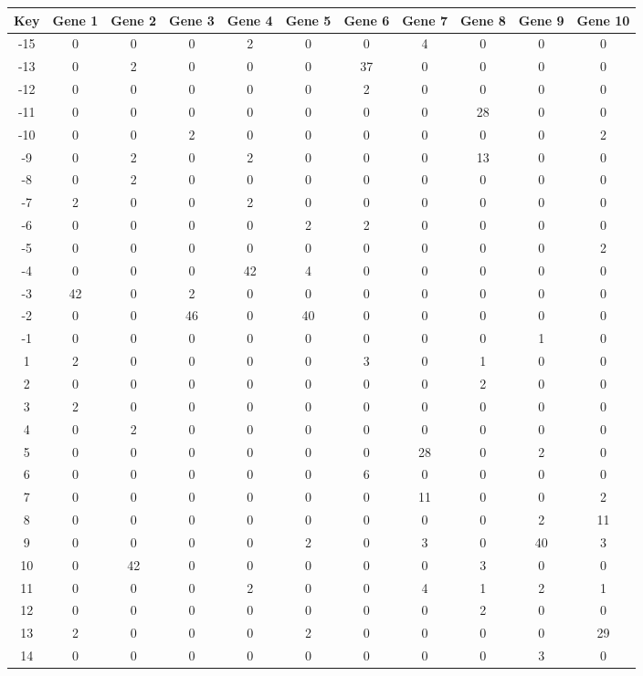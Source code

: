 \begin{tabular}{|c|c|c|c|c|c|c|c|c|c|c|}
\hline
Key & Gene 1 & Gene 2 & Gene 3 & Gene 4 & Gene 5 & Gene 6 & Gene 7 & Gene 8 & Gene 9 & Gene 10 \\
\hline
-15 & 0 & 0 & 0 & 2 & 0 & 0 & 4 & 0 & 0 & 0 \\
-13 & 0 & 2 & 0 & 0 & 0 & 37 & 0 & 0 & 0 & 0 \\
-12 & 0 & 0 & 0 & 0 & 0 & 2 & 0 & 0 & 0 & 0 \\
-11 & 0 & 0 & 0 & 0 & 0 & 0 & 0 & 28 & 0 & 0 \\
-10 & 0 & 0 & 2 & 0 & 0 & 0 & 0 & 0 & 0 & 2 \\
-9 & 0 & 2 & 0 & 2 & 0 & 0 & 0 & 13 & 0 & 0 \\
-8 & 0 & 2 & 0 & 0 & 0 & 0 & 0 & 0 & 0 & 0 \\
-7 & 2 & 0 & 0 & 2 & 0 & 0 & 0 & 0 & 0 & 0 \\
-6 & 0 & 0 & 0 & 0 & 2 & 2 & 0 & 0 & 0 & 0 \\
-5 & 0 & 0 & 0 & 0 & 0 & 0 & 0 & 0 & 0 & 2 \\
-4 & 0 & 0 & 0 & 42 & 4 & 0 & 0 & 0 & 0 & 0 \\
-3 & 42 & 0 & 2 & 0 & 0 & 0 & 0 & 0 & 0 & 0 \\
-2 & 0 & 0 & 46 & 0 & 40 & 0 & 0 & 0 & 0 & 0 \\
-1 & 0 & 0 & 0 & 0 & 0 & 0 & 0 & 0 & 1 & 0 \\
1 & 2 & 0 & 0 & 0 & 0 & 3 & 0 & 1 & 0 & 0 \\
2 & 0 & 0 & 0 & 0 & 0 & 0 & 0 & 2 & 0 & 0 \\
3 & 2 & 0 & 0 & 0 & 0 & 0 & 0 & 0 & 0 & 0 \\
4 & 0 & 2 & 0 & 0 & 0 & 0 & 0 & 0 & 0 & 0 \\
5 & 0 & 0 & 0 & 0 & 0 & 0 & 28 & 0 & 2 & 0 \\
6 & 0 & 0 & 0 & 0 & 0 & 6 & 0 & 0 & 0 & 0 \\
7 & 0 & 0 & 0 & 0 & 0 & 0 & 11 & 0 & 0 & 2 \\
8 & 0 & 0 & 0 & 0 & 0 & 0 & 0 & 0 & 2 & 11 \\
9 & 0 & 0 & 0 & 0 & 2 & 0 & 3 & 0 & 40 & 3 \\
10 & 0 & 42 & 0 & 0 & 0 & 0 & 0 & 3 & 0 & 0 \\
11 & 0 & 0 & 0 & 2 & 0 & 0 & 4 & 1 & 2 & 1 \\
12 & 0 & 0 & 0 & 0 & 0 & 0 & 0 & 2 & 0 & 0 \\
13 & 2 & 0 & 0 & 0 & 2 & 0 & 0 & 0 & 0 & 29 \\
14 & 0 & 0 & 0 & 0 & 0 & 0 & 0 & 0 & 3 & 0 \\
\hline
\end{tabular}